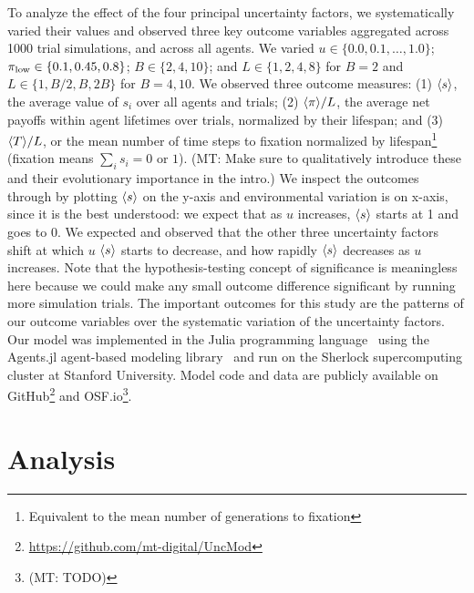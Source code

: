 \documentclass[letterpaper,11.5pt]{scrartcl}
\newcommand{\mt}[1]{{\textcolor{myorange} {({\tiny MT:} #1)}}}
\begin{document}
To analyze the effect of the four principal uncertainty factors, we systematically
varied their values and observed three key outcome variables aggregated across 1000
trial simulations, and across all agents. We varied $u \in \{0.0,
0.1, \ldots, 1.0\}$; $\pi_{\mathrm{low}} \in \{0.1, 0.45, 0.8\}$; $B \in \{2, 4, 10\}$; and $L
\in \{1,2,4,8\}$ for $B=2$ and $L \in \{1,B/2,B,2B\}$ for $B=4,10$.  We observed
three outcome measures: (1) $\langle s \rangle$, the average value of $s_i$ over all agents
and trials; (2) $\langle \pi \rangle / L$, the average net payoffs within agent lifetimes over
trials, normalized by their lifespan; and (3) $\langle T \rangle / L$, or the mean number
of time steps to fixation normalized by lifespan\footnote{Equivalent to the mean
number of generations to fixation} 
(fixation means $\sum_i s_i = 0 \text{ or } 1$). \mt{Make sure to qualitatively
introduce these and their evolutionary importance in the intro.}
We inspect the outcomes through by plotting $\langle s \rangle$ on the y-axis and environmental
variation is on x-axis, since it is the best understood: we expect that as $u$
increases, $\langle s \rangle$ starts at 1 and goes to 0. We expected and observed
that the other three uncertainty factors shift at which $u$ $\langle s \rangle$ starts to
decrease, and how rapidly $\langle s \rangle$ decreases as $u$ increases. Note that the
hypothesis-testing concept of significance is meaningless here because we could
make any small outcome difference significant by running more simulation trials.
The important outcomes for this study are the patterns of our outcome 
variables over the systematic variation of the uncertainty factors. 
Our model was implemented in the Julia programming language~\cite{Bezanson2017} 
using the Agents.jl agent-based modeling library~\cite{Datseris2022} and run
on the Sherlock supercomputing cluster at Stanford University. Model code and
data are publicly available on GitHub\footnote{\url{https://github.com/mt-digital/UncMod}} 
and OSF.io\footnote{\mt{TODO}}.


\section{Analysis}
\end{document}
